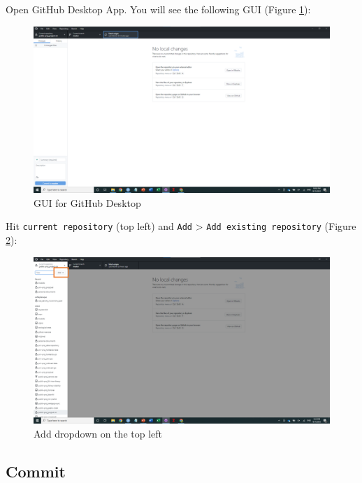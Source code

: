 \documentclass[
]{book}
\begin{document}
Open GitHub Desktop App. You will see the following GUI (Figure \ref{fig:gitdesktop1}):

\begin{figure}

{\centering \includegraphics[width=61.11in]{image/git_image02} 

}

\caption{GUI for GitHub Desktop}\label{fig:gitdesktop1}
\end{figure}

Hit \texttt{current\ repository} (top left) and \texttt{Add} \textgreater{} \texttt{Add\ existing\ repository} (Figure \ref{fig:gitdesktop2}):

\begin{figure}

{\centering \includegraphics[width=61.11in]{image/git_image03} 

}

\caption{Add dropdown on the top left}\label{fig:gitdesktop2}
\end{figure}

\hypertarget{commit}{%
\subsection{Commit}\label{commit}}
\end{document}
